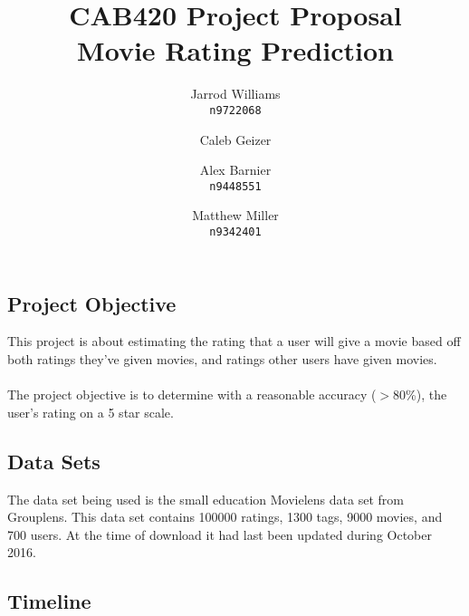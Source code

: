 \documentclass[]{report}   %
\begin{document}
\title{CAB420 Project Proposal \\ \large{Movie Rating Prediction}}   %
\author{
	Jarrod Williams\\
	\texttt{n9722068}
	\and 
	Caleb Geizer\\
	\texttt{}
	\and
	Alex Barnier\\
	\texttt{n9448551}
	\and	
	Matthew Miller\\
	\texttt{n9342401}
}
\maketitle

\subsection*{Project Objective}
This project is about estimating the rating that a user will give a movie based off both ratings they've given movies, and ratings other users have given movies.
~\\\\
The project objective is to determine with a reasonable accuracy ($>$80\%), the user's rating on a 5 star scale.
\subsection*{Data Sets}
The data set being used is the small education Movielens data set from Grouplens. This data set contains 100000 ratings, 1300 tags, 9000 movies, and 700 users. At the time of download it had last been updated during October 2016.

\subsection*{Timeline}
\end{document}
